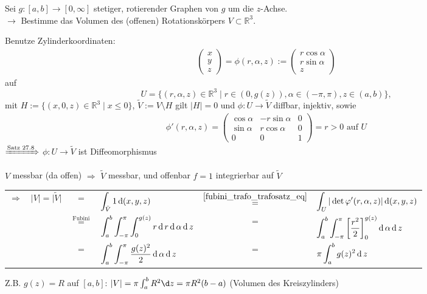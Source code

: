 \begin{example}
	Sei $g:[a,b]\to[0,\infty]$ stetiger, rotierender Graphen von $g$ um die $z$-Achse. \\
	$\rightarrow$ Bestimme das Volumen des (offenen) Rotationskörpers $V\subset\mathbb{R}^3$.
	
	Benutze Zylinderkoordinaten:\begin{align*}
		\begin{pmatrix}
			x \\ y \\ z
		\end{pmatrix} = \phi(r,\alpha, z) := \begin{pmatrix}
			r\cos \alpha \\ r \sin\alpha \\ z
		\end{pmatrix}
	\end{align*}
	auf \[U= \{ (r,\alpha,z) \in\mathbb{R}^3 \mid r \in (0, g(z)), \alpha\in (-\pi,\pi),z\in(a,b) \},\] mit $H:= \{ (x,0,z) \in\mathbb{R}^3 \mid x \le 0 \}$, $\tilde{V} := V \setminus H $ gilt $\vert H \vert = 0$ und $\phi:U\to\tilde{V}$ \gls{diffbar}, injektiv, sowie \begin{align*}
		\phi'(r,\alpha,z) = \begin{pmatrix}
			\cos \alpha & - r\sin \alpha & 0 \\ \sin \alpha & r \cos \alpha & 0 \\ 0 & 0 & 1
		\end{pmatrix} = r > 0\text{ auf $U$}
	\end{align*}
	$\xRightarrow{\text{Satz 27.8}}$ $\phi:U\to\tilde{V}$ ist Diffeomorphismus
	
	$V$ messbar (da offen) $\Rightarrow$ $\tilde{V}$ messbar, und offenbar $f=1$ integrierbar auf $\tilde{V}$ \\
	\renewcommand{\arraystretch}{3}
	\begin{tabularx}{\linewidth}{r@{\ \ }r@{\ }c@{\ }l@{\ }c@{\ }X}
		$\Rightarrow$ & $\vert V \vert = \vert \tilde{V} \vert$ &=& $\displaystyle\int_{\tilde{V}} 1 \operatorname{d} (x,y,z)$ &$ \overset{\eqref{fubini_trafo_trafosatz_eq}}{=}$ &  $\displaystyle\int_U \vert \det \varphi'(r,\alpha,z)\vert \operatorname{d} (x,y,z)$ \\
		& & $\overset{\text{Fubini}}{=}$ &  $\displaystyle \int_a^b \int_{-\pi}^\pi \int_0^{g(z)} r \operatorname{d} r \operatorname{d} \alpha \operatorname{d} z$ &=& $\displaystyle\int_a^b \int_{-\pi}^\pi \left[ \frac{r^2}{2} \right]_0^{g(z)} \operatorname{d} \alpha \operatorname{d} z$ \\
		& & =  & $\displaystyle\int_a^b \int_{-\pi}^\pi \frac{g(z)^2}{2} \operatorname{d} \alpha \operatorname{d} z$ &=& $\displaystyle\pi \int_a^b g(z)^2\operatorname{d} z$
	\end{tabularx}
	
	
	Z.B. $g(z) = R$ auf $[a,b]$: $\vert V \vert = \pi \int_a^b R^2 \d z = \pi R^2(b - a)$ (Volumen des Kreiszylinders)
\end{example}